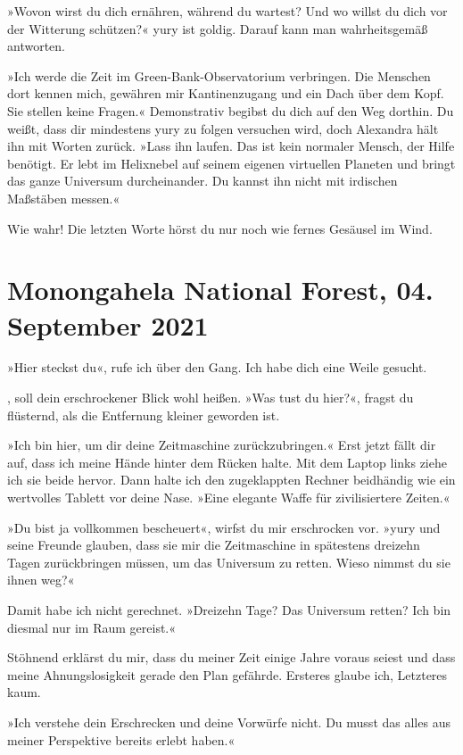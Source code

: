 »Wovon wirst du dich ernähren, während du wartest? Und wo willst du dich vor der Witterung schützen?« yury ist goldig. Darauf kann man wahrheitsgemäß antworten.

»Ich werde die Zeit im Green-Bank-Observatorium verbringen. Die Menschen dort kennen mich, gewähren mir Kantinenzugang und ein Dach über dem Kopf. Sie stellen keine Fragen.« Demonstrativ begibst du dich auf den Weg dorthin. Du weißt, dass dir mindestens yury zu folgen versuchen wird, doch Alexandra hält ihn mit Worten zurück. »Lass ihn laufen. Das ist kein normaler Mensch, der Hilfe benötigt. Er lebt im Helixnebel auf seinem eigenen virtuellen Planeten und bringt das ganze Universum durcheinander. Du kannst ihn nicht mit irdischen Maßstäben messen.«

Wie wahr! Die letzten Worte hörst du nur noch wie fernes Gesäusel im Wind.


\chapter{Monongahela National Forest, 04. September 2021}

»Hier steckst du«, rufe ich über den Gang. Ich habe dich eine Weile gesucht.

, soll dein erschrockener Blick wohl heißen. »Was tust du hier?«, fragst du flüsternd, als die Entfernung kleiner geworden ist.

»Ich bin hier, um dir deine Zeitmaschine zurückzubringen.« Erst jetzt fällt dir auf, dass ich meine Hände hinter dem Rücken halte. Mit dem Laptop links ziehe ich sie beide hervor. Dann halte ich den zugeklappten Rechner beidhändig wie ein wertvolles Tablett vor deine Nase. »Eine elegante Waffe für zivilisiertere Zeiten.«

»Du bist ja vollkommen bescheuert«, wirfst du mir erschrocken vor. »yury und seine Freunde glauben, dass sie mir die Zeitmaschine in spätestens dreizehn Tagen zurückbringen müssen, um das Universum zu retten. Wieso nimmst du sie ihnen weg?«

Damit habe ich nicht gerechnet. »Dreizehn Tage? Das Universum retten? Ich bin diesmal nur im Raum gereist.«

Stöhnend erklärst du mir, dass du meiner Zeit einige Jahre voraus seiest und dass meine Ahnungslosigkeit gerade den Plan gefährde. Ersteres glaube ich, Letzteres kaum.

»Ich verstehe dein Erschrecken und deine Vorwürfe nicht. Du musst das alles aus meiner Perspektive bereits erlebt haben.«

